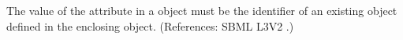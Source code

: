 The value of the attribute  in a \Species object must be
the identifier of an existing \Compartment object defined in the enclosing
\Model object.  (References: SBML L3V2
.)
